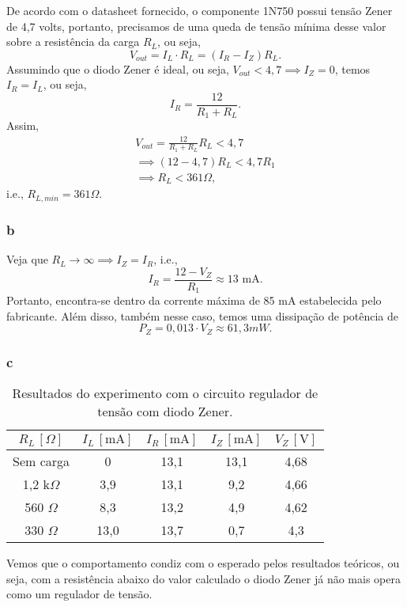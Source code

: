 \documentclass[a4paper]{report}
\begin{document}
De acordo com o datasheet fornecido, o componente 1N750 possui tensão Zener de 4,7 volts, portanto, precisamos de uma queda de tensão mínima desse valor sobre a resistência da carga $R_L$, ou seja, \[
    V_{out} = I_L \cdot R_L = \left( I_R-I_Z \right) R_L
.\] Assumindo que o diodo Zener é ideal, ou seja, $V_{out} < 4,7 \implies I_Z = 0$, temos $I_R = I_L$, ou seja, \[
I_R = \frac{12}{R_1 + R_L}
.\] Assim,
\begin{align*}
    V_{out} = \frac{12}{R_1 + R_L}R_L < 4,7 \\
    \implies \left( 12 - 4,7 \right) R_L < 4,7 R_1 \\
    \implies R_L < 361 \Omega
,\end{align*}
i.e., $R_{L,min} = 361 \Omega$.

\subsubsection*{b}

Veja que $R_L \to \infty \implies I_Z = I_R$, i.e., \[
    I_R = \frac{12-V_Z}{R_1} \approx 13 \text{ mA}
.\] Portanto, encontra-se dentro da corrente máxima de 85 mA estabelecida pelo fabricante. Além disso, também nesse caso, temos uma dissipação de potência de \[
P_Z = 0,013 \cdot V_Z \approx 61,3 mW
.\] 

\subsubsection*{c}

\begin{table}[H]
    \centering
    \caption{Resultados do experimento com o circuito regulador de tensão com diodo Zener.}
    \label{tab:1-zener}
    \begin{tabular}{c | c | c | c | c}
    $R_L\,\left[ \Omega \right] $ & $I_L\,\left[ \text{mA} \right]$ & $I_R\,\left[ \text{mA} \right]$ & $I_Z\,\left[ \text{mA} \right]$ & $V_Z\,\left[ \text{V} \right]$ \\
    \hline
    Sem carga & 0 & 13,1 & 13,1 & 4,68 \\
    1,2 k$\Omega$ & 3,9 & 13,1 & 9,2 & 4,66 \\
    560 $\Omega$ & 8,3 & 13,2 & 4,9 & 4,62 \\
    330 $\Omega$ & 13,0 & 13,7 & 0,7 & 4,3 \\
    \end{tabular}
\end{table}

Vemos que o comportamento condiz com o esperado pelos resultados teóricos, ou seja, com a resistência abaixo do valor calculado o diodo Zener já não mais opera como um regulador de tensão.
\end{document}
